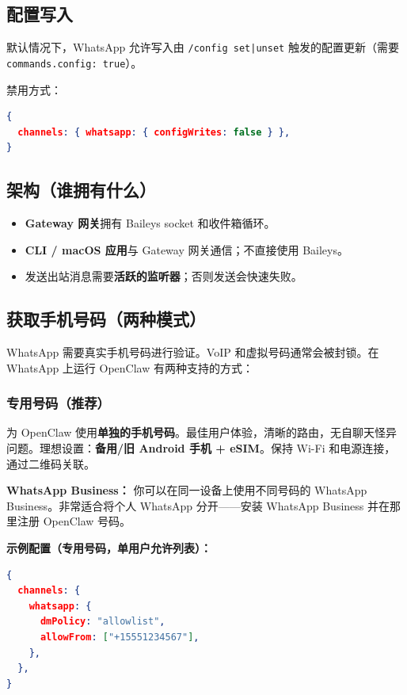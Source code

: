 \subsection{配置写入}


默认情况下，WhatsApp 允许写入由 \texttt{/config set|unset} 触发的配置更新（需要 \texttt{commands.config: true}）。

禁用方式：

\begin{lstlisting}[language=json]
{
  channels: { whatsapp: { configWrites: false } },
}
\end{lstlisting}


\subsection{架构（谁拥有什么）}


\begin{itemize}
  \item \textbf{Gateway 网关}拥有 Baileys socket 和收件箱循环。
  \item \textbf{CLI / macOS 应用}与 Gateway 网关通信；不直接使用 Baileys。
  \item 发送出站消息需要\textbf{活跃的监听器}；否则发送会快速失败。
\end{itemize}


\subsection{获取手机号码（两种模式）}


WhatsApp 需要真实手机号码进行验证。VoIP 和虚拟号码通常会被封锁。在 WhatsApp 上运行 OpenClaw 有两种支持的方式：

\subsubsection{专用号码（推荐）}


为 OpenClaw 使用\textbf{单独的手机号码}。最佳用户体验，清晰的路由，无自聊天怪异问题。理想设置：\textbf{备用/旧 Android 手机 + eSIM}。保持 Wi-Fi 和电源连接，通过二维码关联。

\textbf{WhatsApp Business：} 你可以在同一设备上使用不同号码的 WhatsApp Business。非常适合将个人 WhatsApp 分开——安装 WhatsApp Business 并在那里注册 OpenClaw 号码。

\textbf{示例配置（专用号码，单用户允许列表）：}

\begin{lstlisting}[language=json]
{
  channels: {
    whatsapp: {
      dmPolicy: "allowlist",
      allowFrom: ["+15551234567"],
    },
  },
}
\end{lstlisting}


